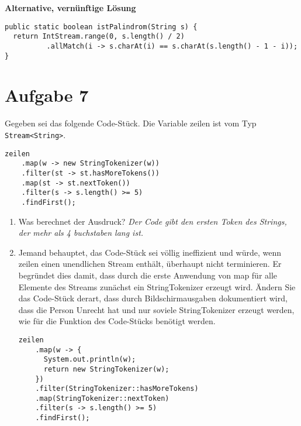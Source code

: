 \textbf{Alternative, vernünftige Lösung}

\begin{lstlisting}
public static boolean istPalindrom(String s) {
  return IntStream.range(0, s.length() / 2)
          .allMatch(i -> s.charAt(i) == s.charAt(s.length() - 1 - i));
}
\end{lstlisting}

\section{Aufgabe 7}
Gegeben sei das folgende Code-Stück. Die Variable zeilen ist vom Typ
\lstinline{Stream<String>}.

\begin{lstlisting}
zeilen
    .map(w -> new StringTokenizer(w))
    .filter(st -> st.hasMoreTokens())
    .map(st -> st.nextToken())
    .filter(s -> s.length() >= 5)
    .findFirst();
\end{lstlisting}

\begin{enumerate}
  \item Was berechnet der Ausdruck? \newline
  \textit{Der Code gibt den ersten Token des Strings, der mehr als 4 buchstaben lang ist.}
  \item Jemand behauptet, das Code-Stück sei völlig ineffizient und würde, wenn zeilen
        einen unendlichen Stream enthält, überhaupt nicht terminieren. Er begründet
        dies damit, dass durch die erste Anwendung von map für alle Elemente des
        Streams zunächst ein StringTokenizer erzeugt wird. Ändern Sie das Code-Stück
        derart, dass durch Bildschirmausgaben dokumentiert wird, dass die Person
        Unrecht hat und nur soviele StringTokenizer erzeugt werden, wie für die
        Funktion des Code-Stücks benötigt werden.
\begin{lstlisting}
zeilen
    .map(w -> {
      System.out.println(w);
      return new StringTokenizer(w);
    })
    .filter(StringTokenizer::hasMoreTokens)
    .map(StringTokenizer::nextToken)
    .filter(s -> s.length() >= 5)
    .findFirst();
\end{lstlisting}
\end{enumerate}

